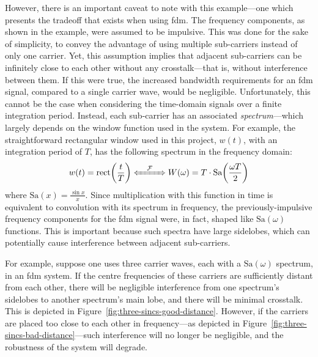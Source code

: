 \documentclass[class=report,11pt,crop=false]{standalone}
\begin{document}
However, there is an important caveat to note with this example---one which presents the tradeoff that exists when using \gls{fdm}. The frequency components, as shown in the example, were assumed to be impulsive. This was done for the sake of simplicity, to convey the advantage of using multiple sub-carriers instead of only one carrier. Yet, this assumption implies that adjacent sub-carriers can be infinitely close to each other without any crosstalk---that is, without interference between them. If this were true, the increased bandwidth requirements for an \gls{fdm} signal, compared to a single carrier wave, would be negligible. Unfortunately, this cannot be the case when considering the time-domain signals over a finite integration period. Instead, each sub-carrier has an associated \emph{spectrum}---which largely depends on the window function used in the system. For example, the straightforward rectangular window used in this project, \(w(t)\), with an integration period of \(T\), has the following spectrum in the frequency domain:
\begin{equation}
    w(t) = \textrm{rect}\bigg(\frac{t}{T}\bigg) \xLeftrightarrow{\quad\mathcal{F}\quad} W(\omega) = T \cdot \textrm{Sa}\bigg(\frac{\omega T}{2}\bigg)
\end{equation}
where \(\textrm{Sa}(x)=\frac{\sin{x}}{x}\). Since multiplication with this function in time is equivalent to convolution with its spectrum in frequency, the previously-impulsive frequency components for the \gls{fdm} signal were, in fact, shaped like \(\textrm{Sa}(\omega)\) functions. This is important because such spectra have large sidelobes, which can potentially cause interference between adjacent sub-carriers.

For example, suppose one uses three carrier waves, each with a \(\textrm{Sa}(\omega)\) spectrum, in an \gls{fdm} system. If the centre frequencies of these carriers are sufficiently distant from each other, there will be negligible interference from one spectrum's sidelobes to another spectrum's main lobe, and there will be minimal crosstalk. This is depicted in Figure~\ref{fig:three-sincs-good-distance}. However, if the carriers are placed too close to each other in frequency---as depicted in Figure~\ref{fig:three-sincs-bad-distance}---such interference will no longer be negligible, and the robustness of the system will degrade.
\end{document}
